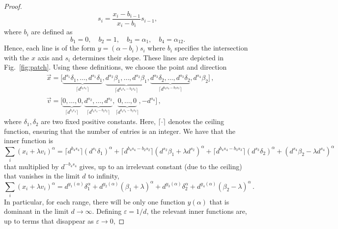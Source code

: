 \documentclass[aps,pra,11pt,onecolumn,nofootinbib,tightenlines]{revtex4-2}
\theoremstyle{definition}
\begin{document}
\begin{proof}
\begin{equation}
    s_i = \frac{x_i - b_{i-1}}{x_i - b_i} s_{i-1}, 
\end{equation}
where $b_i$ are defined as
\begin{equation}
    b_1 = 0, \quad b_2 = 1, \quad b_3 = \alpha_1, \quad b_4 = \alpha_{12}.
\end{equation}
Hence, each line is of the form $y = (\alpha - b_i) s_i$ where $b_i$ specifies the intersection with the $x$ axis and $s_i$ determines their slope. These lines are depicted in Fig.~\ref{fig:patch}.
Using these definitions, we choose the point and direction
\begin{align}
&\vec{x}=\bigg[\underbrace{d^{s_1} \delta_1,\ldots,d^{s_1} \delta_1}_{\lceil d^{b_4 s_4}\rceil },\underbrace{d^{s_2} \beta_1,\ldots,d^{s_2} \beta_1}_{\lceil d^{b_4 s_4 -b_2 s_2}\rceil},\underbrace{d^{s_3} \delta_2,\ldots,d^{s_3} \delta_2}_{\lceil d^{b_4 s_4 -b_3 s_3}\rceil},d^{s_4} \beta_2\bigg] \,,
\\
&\vec{v}=\bigg[\underbrace{0,\ldots,0}_{\lceil d^{b_4 s_4}\rceil },\underbrace{d^{s_2} ,\ldots,d^{s_2}}_{\lceil d^{b_4 s_4 -b_2 s_2}\rceil},\underbrace{0,\ldots,0}_{\lceil d^{b_4 s_4 -b_3 s_3}\rceil},-d^{s_4} \bigg]\,,
\end{align}
where $\delta_1,\delta_2$ are two fixed positive constants. Here, $\lceil \cdot \rceil$ denotes the ceiling function, ensuring that the number of entries is an integer. We have that the inner function is
\begin{equation}
\label{eq: contributions lines}
    \sum_i(x_i+\lambda v_i)^\alpha = \lceil d^{b_4 s_4}\rceil (d^{s_1}\delta_1)^\alpha  + \lceil d^{b_4 s_4 -b_2 s_2}\rceil (d^{s_2}\beta_1+\lambda d^{s_2})^\alpha + \lceil d^{b_4 s_4 -b_3 s_3}\rceil (d^{s_3}\delta_2)^\alpha + (d^{s_4}\beta_2-\lambda d^{s_4})^\alpha
\end{equation}
that multiplied by $d^{-b_4 s_4}$ gives, up to an irrelevant constant (due to the ceiling) that vanishes in the limit $d$ to infinity, 
\begin{equation}
    \sum_i(x_i+\lambda v_i)^\alpha  =  d^{y_1(\alpha)}\delta_1^\alpha  +  d^{y_2(\alpha)} (\beta_1+\lambda )^\alpha +  d^{y_3(\alpha)} \delta_2^\alpha + d^{y_4(\alpha)}(\beta_2-\lambda)^\alpha \,.
\end{equation}
In particular, for each range, there will be only one function $y(\alpha)$ that is dominant in the limit $d\rightarrow \infty$. Defining $\varepsilon = 1/d$,  the relevant inner functions are, up to terms that disappear as $\varepsilon \rightarrow 0$,

\end{proof}
\end{document}
